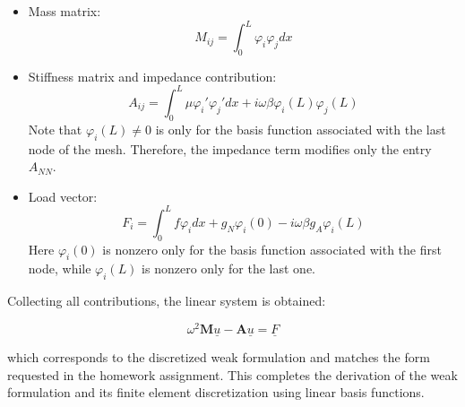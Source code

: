 \begin{itemize}
    \item Mass matrix:
    \[
    M_{ij} = \int_0^L \varphi_i \varphi_jdx
    \]
    \item Stiffness matrix and impedance contribution:
    \[
    A_{ij} = \int_0^L \mu \varphi_i' \varphi_j' dx + i \omega \beta \varphi_i(L) \varphi_j(L)
    \]
    Note that \( \varphi_i(L)\neq 0 \) is only for the basis function associated with the last node of the mesh. Therefore, the impedance term modifies only the entry \( A_{NN} \).
    \item Load vector:
    \[
    F_i = \int_0^L f \varphi_i dx + g_N \varphi_i(0) - i \omega \beta g_A \varphi_i(L)
    \]
    Here \( \varphi_i(0) \) is nonzero only for the basis function associated with the first node, while \( \varphi_i(L) \) is nonzero only for the last one.
\end{itemize}

Collecting all contributions, the linear system is obtained:

\begin{equation}
\omega^2 \mathbf{M} \underline{u} - \mathbf{A} \underline{u} = \underline{F}
\label{eq:algsystm}
\end{equation}

which corresponds to the discretized weak formulation and matches the form requested in the homework assignment. This completes the derivation of the weak formulation and its finite element discretization using linear basis functions.